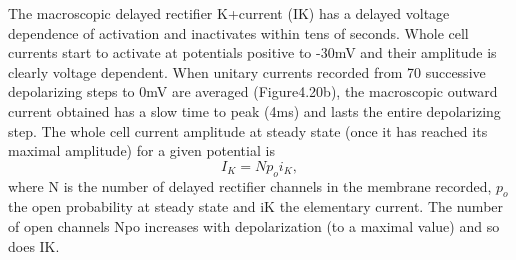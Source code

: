 \documentclass[../../Orator]{subfiles}
\begin{document}
The macroscopic delayed rectifier K+current (IK) has a delayed voltage dependence of activation and inactivates within tens of seconds. Whole cell currents start to activate at potentials positive to -30mV and their amplitude is clearly voltage dependent. When unitary currents recorded from 70 successive depolarizing steps to 0mV are averaged (Figure4.20b), the macroscopic outward current obtained has a slow time to peak (4ms) and lasts the entire depolarizing step. The whole cell current amplitude at steady state (once it has reached its maximal amplitude) for a given potential is
\[I_K= N p_o i_K,\]
where N is the number of delayed rectifier channels in the membrane recorded, \(p_o\) the open probability at steady state and iK the elementary current. The number of open channels Npo increases with depolarization (to a maximal value) and so does IK. 
\end{document}
